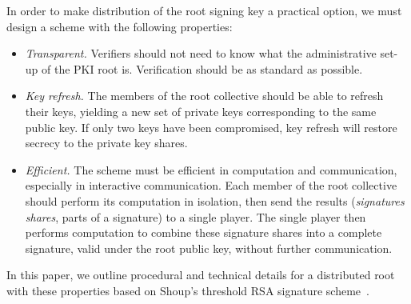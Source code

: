 In order to make distribution of the root signing key a practical option, we must design a scheme with the following properties:
\begin{itemize}
\item {\it Transparent.} Verifiers should not need to know what the administrative set-up of the PKI root is. Verification should be as standard as possible.
\item {\it Key refresh.} The members of the root collective should be able to refresh their keys, yielding a new set of private keys corresponding to the same public key. If only two keys have been compromised, key refresh will restore secrecy to the private key shares.
\item {\it Efficient.} The scheme must be efficient in computation and communication, especially in interactive communication. Each member of the root collective should perform its computation in isolation, then send the results ({\it signatures shares}, parts of a signature) to a single player. The single player then performs computation to combine these signature shares into a complete signature, valid under the root public key, without further communication.
\end{itemize}

In this paper, we outline procedural and technical details for a distributed root with these properties based on Shoup's threshold RSA signature scheme~\cite{shoup-sig}.